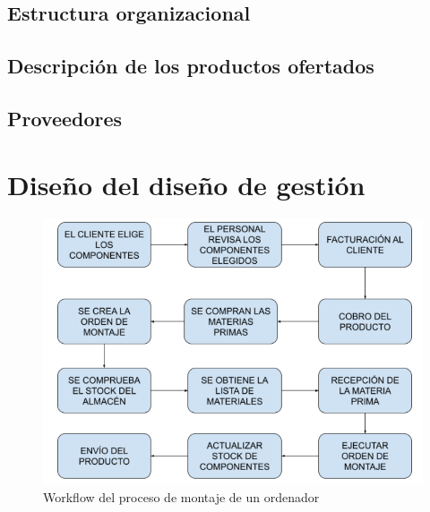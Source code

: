 \documentclass[12pt, letterpaper]{article}
\begin{document}
\subsection{Estructura organizacional}

\subsection{Descripción de los productos ofertados}

\subsection{Proveedores}

\pagebreak
\section{Diseño del diseño de gestión}
\begin{figure}[ht]
    \includegraphics[width=\textwidth]{workflow.png}
    \caption{\textsf{Workflow del proceso de montaje de un ordenador}}
    \label{workflow}
\end{figure}

\pagebreak

\end{document}
